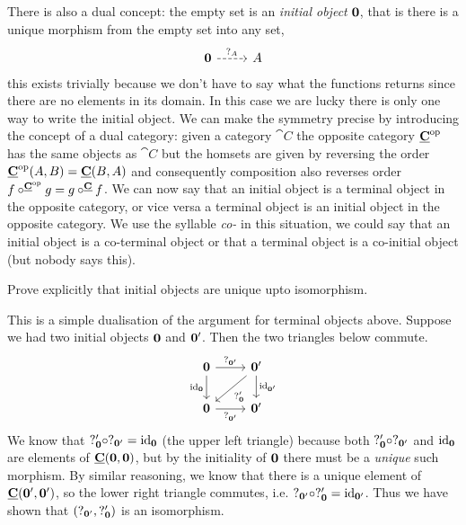 There is also a dual concept: the empty set is an \emph{initial object} $\bf{0}$, that is there is a unique morphism from the empty set into any set, 
\[\begin{tikzcd}
  \bf{0} \arrow[r, dashrightarrow, "?_A"] & A
\end{tikzcd}\]
this exists trivially because we don't have to say what the functions returns since there are no elements in its domain. In this case we are lucky there is only one way to write the initial object. We can make the symmetry precise by introducing the concept of a dual category: given a category $\cat{C}$ the opposite category $\underline{\mathbf{C}}^{\mathrm{op}}$ has the same objects as $\cat{C}$ but the homsets are given by reversing the order $\underline{\mathbf{C}}^{\mathrm{op}}(A,B) = \underline{\mathbf{C}}(B,A)$ and consequently composition also reverses order $f \circ^{\underline{\mathbf{C}}^{\mathrm{op}}} g = g \circ^{\underline{\mathbf{C}}} f$. We can now say that an initial object is a terminal object in the opposite category, or vice versa a terminal object is an initial object in the opposite 
category. We use the syllable \emph{co-} in this situation, we could say that an initial object is a co-terminal object or that a terminal object is a co-initial object (but nobody says this).

\begin{Exercise}
  Prove explicitly that initial objects are unique upto isomorphism.
\end{Exercise}
\begin{Answer}
  This is a simple dualisation of the argument for terminal objects above. Suppose we had two initial objects $\bf{0}$ and $\bf{0'}$. Then the two triangles below commute.
  \[\begin{tikzcd}
      \bf{0} \arrow{r}{?_{\bf{0'}}} \arrow[swap]{d}{\id_{\bf 0}} & \bf{0'} \arrow{d}{\id_{\bf 0'}} \arrow{dl}{?'_{\bf{0}}} \\
      \bf{0} \arrow[swap]{r}{?_{\bf{0'}}} & \bf{0'}
  \end{tikzcd}\]
  We know that $?'_{\bf 0}\circ ?_{\bf 0'}=\mathrm{id}_{\bf 0}$ (the upper left triangle) because both $?'_{\bf 0}\circ ?_{\bf 0'}$ and $\mathrm{id}_{\bf 0}$ are elements of $\underline{\mathbf{C}}({\bf 0}, {\bf 0})$, but by the initiality of $\bf{0}$ there must be a \emph{unique} such morphism. By similar reasoning, we know that there is a unique element of $\underline{\mathbf{C}}({\bf 0'}, {\bf 0'})$, so the lower right triangle commutes, i.e. $?_{\bf 0'}\circ ?'_{\bf 0}=\mathrm{id}_{\bf 0'}$. Thus we have shown that $(?_{\bf 0'},?'_{\bf 0})$ is an isomorphism.
\end{Answer}

